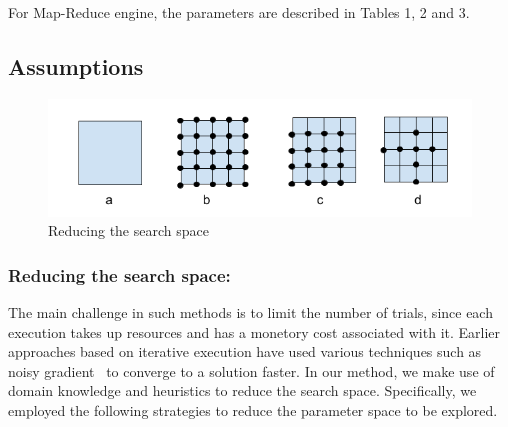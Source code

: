 For Map-Reduce engine, the parameters are described in Tables 1, 2 and 3.

\subsection{Assumptions}

\begin{figure}[h]
	\includegraphics[width=\linewidth]{fig/searchspace.png}
	\caption{Reducing the search space}
	\label{fig:searchspace}
\end{figure}


\noindent\subsubsection*{\bf Reducing the search space: }
The main challenge in such methods is to limit the number of trials, since each execution takes up resources and has a monetory cost associated with it. Earlier approaches based on iterative execution have used various techniques such as noisy gradient~\cite{} to converge to a solution faster. In our method, we make use of domain knowledge and heuristics to reduce the search space. Specifically, we employed the following strategies to reduce the parameter space to be explored.

